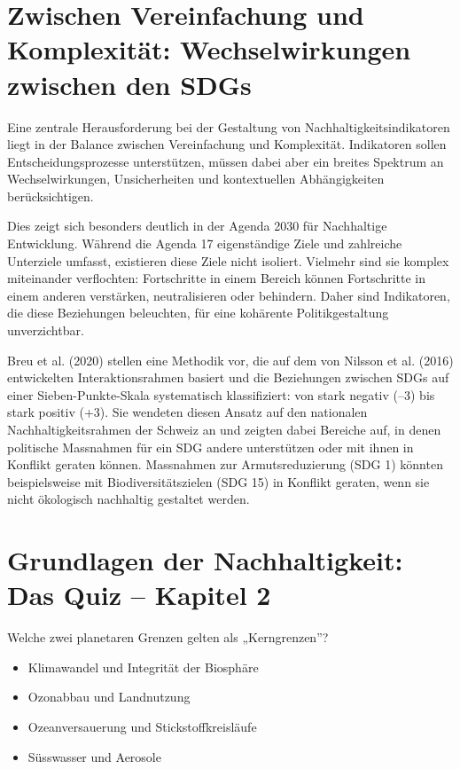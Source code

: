 \documentclass[
  nswissgerman,
  a4paper,
  DIV=11,
  numbers=noendperiod,
  oneside,
  openany]{scrreprt}
\providecommand{\tightlist}{%
  \setlength{\itemsep}{0pt}\setlength{\parskip}{0pt}}
\begin{document}
\section{Zwischen Vereinfachung und Komplexität: Wechselwirkungen
zwischen den
SDGs}\label{zwischen-vereinfachung-und-komplexituxe4t-wechselwirkungen-zwischen-den-sdgs}

Eine zentrale Herausforderung bei der Gestaltung von
Nachhaltigkeitsindikatoren liegt in der Balance zwischen Vereinfachung
und Komplexität. Indikatoren sollen Entscheidungsprozesse unterstützen,
müssen dabei aber ein breites Spektrum an Wechselwirkungen,
Unsicherheiten und kontextuellen Abhängigkeiten berücksichtigen.

Dies zeigt sich besonders deutlich in der Agenda 2030 für Nachhaltige
Entwicklung. Während die Agenda 17 eigenständige Ziele und zahlreiche
Unterziele umfasst, existieren diese Ziele nicht isoliert. Vielmehr sind
sie komplex miteinander verflochten: Fortschritte in einem Bereich
können Fortschritte in einem anderen verstärken, neutralisieren oder
behindern. Daher sind Indikatoren, die diese Beziehungen beleuchten, für
eine kohärente Politikgestaltung unverzichtbar.

Breu et al. (2020) stellen eine Methodik vor, die auf dem von Nilsson et
al. (2016) entwickelten Interaktionsrahmen basiert und die Beziehungen
zwischen SDGs auf einer Sieben-Punkte-Skala systematisch klassifiziert:
von stark negativ (--3) bis stark positiv (+3). Sie wendeten diesen
Ansatz auf den nationalen Nachhaltigkeitsrahmen der Schweiz an und
zeigten dabei Bereiche auf, in denen politische Massnahmen für ein SDG
andere unterstützen oder mit ihnen in Konflikt geraten können.
Massnahmen zur Armutsreduzierung (SDG 1) könnten beispielsweise mit
Biodiversitätszielen (SDG 15) in Konflikt geraten, wenn sie nicht
ökologisch nachhaltig gestaltet werden.

\section{Grundlagen der Nachhaltigkeit: Das Quiz -- Kapitel
2}\label{grundlagen-der-nachhaltigkeit-das-quiz-kapitel-2}

Welche zwei planetaren Grenzen gelten als „Kerngrenzen''?

\begin{itemize}
\tightlist
\item[$\square$]
  Klimawandel und Integrität der Biosphäre
\item[$\square$]
  Ozonabbau und Landnutzung
\item[$\square$]
  Ozeanversauerung und Stickstoffkreisläufe
\item[$\square$]
  Süsswasser und Aerosole
\end{itemize}
\end{document}
